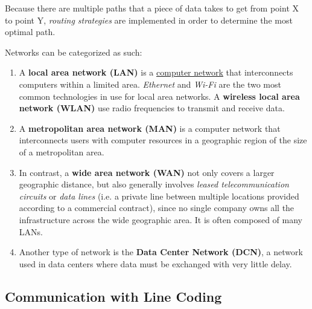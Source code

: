 \documentclass{article}
\newcounter{definition}[section]
\begin{document}
  Because there are multiple paths that a piece of data takes to get from point X to point Y, \textit{routing strategies} are implemented in order to determine the most optimal path.  

  \begin{definition}
    \label{def:lan-wan-and-other-network-scales}
  Networks can be categorized as such: 
  \begin{enumerate}
      \item A \textbf{local area network (LAN)} is a \hyperref[def:computer-network]{computer network} that interconnects computers within a limited area. \textit{Ethernet} and \textit{Wi-Fi} are the two most common technologies in use for local area networks. A \textbf{wireless local area network (WLAN)} use radio frequencies to transmit and receive data. 
      \item A \textbf{metropolitan area network (MAN)} is a computer network that interconnects users with computer resources in a geographic region of the size of a metropolitan area. 
      \item In contrast, a \textbf{wide area network (WAN)} not only covers a larger geographic distance, but also generally involves \textit{leased telecommunication circuits} or \textit{data lines} (i.e. a private line between multiple locations provided according to a commercial contract), since no single company owns all the infrastructure across the wide geographic area. It is often composed of many LANs. 
      \item Another type  of network is the \textbf{Data Center Network (DCN)}, a network used in data centers where data must be exchanged with very little delay.
  \end{enumerate}
  \end{definition}

  \subsection{Communication with Line Coding}
\end{document}
